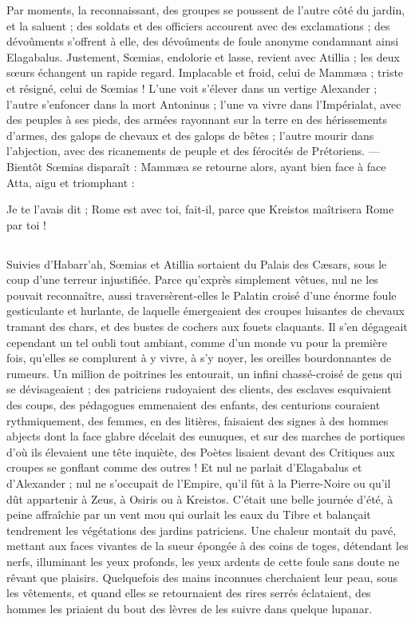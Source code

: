 \documentclass[a4paper, 11pt, oneside, polutonikogreek, french]{article}
\begin{document}
Par moments, la reconnaissant, des groupes se poussent de l'autre côté du jardin, et la saluent ; des soldats et des officiers accourent avec des exclamations ; des dévoûments s'offrent à elle, des dévoûments de foule anonyme condamnant ainsi Elagabalus. Justement, Sœmias, endolorie et lasse, revient avec Atillia ; les deux sœurs échangent un rapide regard. Implacable et froid, celui de Mammæa ; triste et résigné, celui de Sœmias ! L'une voit s'élever dans un vertige Alexander ; l'autre s'enfoncer dans la mort Antoninus ; l'une va vivre dans l'Impérialat, avec des peuples à ses pieds, des armées rayonnant sur la terre en des hérissements d'armes, des galops de chevaux et des galops de bêtes ; l'autre mourir dans l'abjection, avec des ricanements de peuple et des férocités de Prétoriens. --- Bientôt Sœmias disparaît : Mammæa se retourne alors, ayant bien face à face Atta, aigu et triomphant :

Je te l'avais dit ; Rome est avec toi, fait-il, parce que Kreistos maîtrisera Rome par toi !
\clearpage
\subsection{}
\paragraph{}
Suivies d'Habarr'ah, Sœmias et Atillia sortaient du Palais des Cæsars, sous le coup d'une terreur injustifiée. Parce qu'exprès simplement vêtues, nul ne les pouvait reconnaître, aussi traversèrent-elles le Palatin croisé d'une énorme foule gesticulante et hurlante, de laquelle émergeaient des croupes luisantes de chevaux tramant des chars, et des bustes de cochers aux fouets claquants. Il s'en dégageait cependant un tel oubli tout ambiant, comme d'un monde vu pour la première fois, qu'elles se complurent à y vivre, à s'y noyer, les oreilles bourdonnantes de rumeurs. Un million de poitrines les entourait, un infini chassé-croisé de gens qui se dévisageaient ; des patriciens rudoyaient des clients, des esclaves esquivaient des coups, des pédagogues emmenaient des enfants, des centurions couraient rythmiquement, des femmes, en des litières, faisaient des signes à des hommes abjects dont la face glabre décelait des eunuques, et sur des marches de portiques d'où ils élevaient une tête inquiète, des Poètes lisaient devant des Critiques aux croupes se gonflant comme des outres ! Et nul ne parlait d'Elagabalus et d'Alexander ; nul ne s'occupait de l'Empire, qu'il fût à la Pierre-Noire ou qu'il dût appartenir à Zeus, à Osiris ou à Kreistos. C'était une belle journée d'été, à peine affraîchie par un vent mou qui ourlait les eaux du Tibre et balançait tendrement les végétations des jardins patriciens. Une chaleur montait du pavé, mettant aux faces vivantes de la sueur épongée à des coins de toges, détendant les nerfs, illuminant les yeux profonds, les yeux ardents de cette foule sans doute ne rêvant que plaisirs. Quelquefois des mains inconnues cherchaient leur peau, sous les vêtements, et quand elles se retournaient des rires serrés éclataient, des hommes les priaient du bout des lèvres de les suivre dans quelque lupanar.
\end{document}
